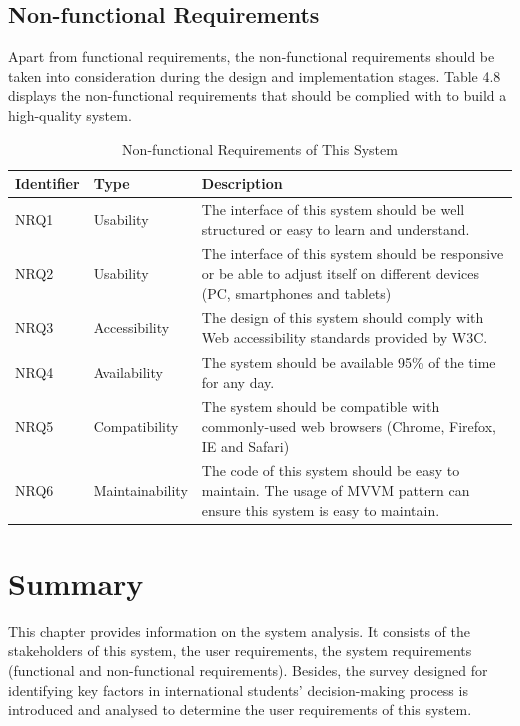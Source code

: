 \subsection{Non-functional Requirements
}

Apart from functional requirements, the non-functional requirements should be taken into consideration during the design and implementation stages. Table 4.8 displays the non-functional requirements that should be complied with to build a high-quality system.

\begin{table}[H]
\centering
\caption{Non-functional Requirements of This System}
\label{my-label}
\begin{tabular}{|p{2cm}|p{3cm}|p{8cm}|}
\hline
\textbf{Identifier} & \textbf{Type}   & \textbf{Description}                                                                                                             \\ \hline
NRQ1                & Usability       & The interface of this system should be well structured or easy to learn and understand.                                          \\ \hline
NRQ2                & Usability       & The interface of this system should be responsive or be able to adjust itself on different devices (PC, smartphones and tablets) \\ \hline
NRQ3                & Accessibility   & The design of this system should comply with Web accessibility standards provided by W3C.                                        \\ \hline
NRQ4                & Availability    & The system should be available  95\% of the time for any day.                                                                    \\ \hline
NRQ5                & Compatibility   & The system should be compatible with commonly-used web browsers (Chrome, Firefox, IE and Safari)                                    \\ \hline
NRQ6                & Maintainability & The code of this system should be easy to maintain. The usage of MVVM pattern can ensure this system is easy to maintain.                                                                              \\ \hline
\end{tabular}
\end{table}


\section{Summary}
This chapter provides information on the system analysis. It consists of the stakeholders of this system, the user requirements, the system requirements (functional and non-functional requirements). Besides, the survey designed for identifying key factors in international students’ decision-making process is introduced and analysed to determine the user requirements of this system.


